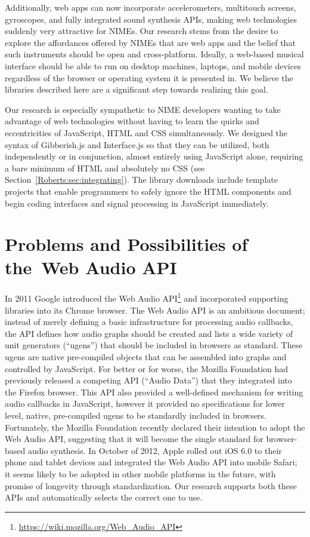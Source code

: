 Additionally, web apps can now incorporate accelerometers, multitouch screens, gyroscopes, and fully integrated sound synthesis APIs, making web technologies suddenly very attractive for NIMEs. Our research stems from the desire to explore the affordances offered by NIMEs that are web apps and the belief that such instruments should be open and cross-platform. Ideally, a web-based musical interface should be able to run on desktop machines, laptops, and mobile devices regardless of the browser or operating system it is presented in. We believe the libraries described here are a significant step towards realizing this goal.

Our research is especially sympathetic to NIME developers wanting to take advantage of web technologies without having to learn the quirks and eccentricities of JavaScript, HTML and CSS simultaneously. We designed the syntax of Gibberish.js and Interface.js so that they can be utilized, both independently or in conjunction, almost entirely using JavaScript alone, requiring a bare minimum of HTML and absolutely no CSS (see Section~\ref{Roberts:sec:integrating}). The library downloads include template projects that enable programmers to safely ignore the HTML components and begin coding interfaces and signal processing in JavaScript immediately.

\section{Problems and Possibilities of the~Web Audio API}

In 2011 Google introduced the Web Audio API\footnote{\url{https://wiki.mozilla.org/Web_Audio_API}} and incorporated supporting libraries into its Chrome browser. The Web Audio API is an ambitious document; instead of merely defining a basic infrastructure for processing audio callbacks, the API  defines how audio graphs should be created and lists a wide variety of unit generators (``ugens'') that should be included in browsers as standard. These ugens are native pre-compiled %
objects that can be assembled into graphs and controlled by JavaScript. For better or for worse, the Mozilla Foundation had previously released a competing API (``Audio Data'') \cite{Humphrey:} that they integrated into the Firefox browser. This API also provided a well-defined mechanism for writing audio callbacks in JavaScript, however it provided no specifications for lower level, native, pre-compiled %
ugens to be standardly included in browsers. Fortunately, the Mozilla Foundation recently declared their intention to adopt the Web Audio API, suggesting that it will become the single standard for browser-based audio synthesis. In October of 2012, Apple rolled out iOS 6.0 to their phone and tablet devices and integrated the Web Audio API into mobile Safari; it seems likely to be adopted in other mobile platforms in the future, with promise of longevity through standardization. Our research supports both these APIs and automatically selects the correct one to use.

